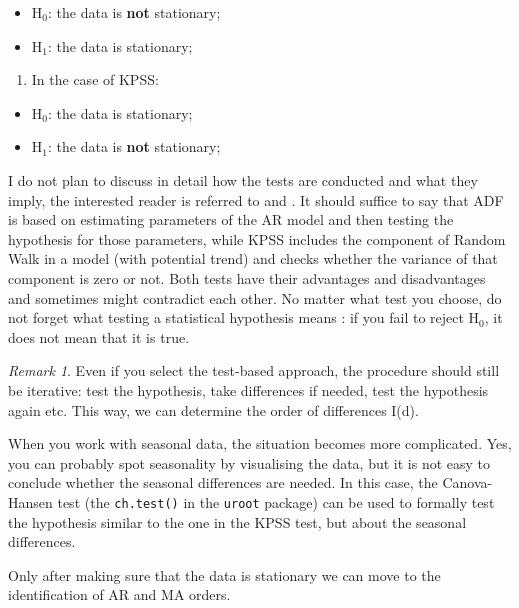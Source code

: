 \documentclass[]{book}
\providecommand{\tightlist}{%
  \setlength{\itemsep}{0pt}\setlength{\parskip}{0pt}}
\theoremstyle{definition}
\theoremstyle{definition}
\theoremstyle{definition}
\theoremstyle{definition}
\theoremstyle{remark}
\newtheorem*{remark}{Remark}
\begin{document}
\begin{itemize}
\tightlist
\item
  H\(_0\): the data is \textbf{not} stationary;
\item
  H\(_1\): the data is stationary;
\end{itemize}

\begin{enumerate}
\def\labelenumi{\arabic{enumi}.}
\setcounter{enumi}{1}
\tightlist
\item
  In the case of KPSS:
\end{enumerate}

\begin{itemize}
\tightlist
\item
  H\(_0\): the data is stationary;
\item
  H\(_1\): the data is \textbf{not} stationary;
\end{itemize}

I do not plan to discuss in detail how the tests are conducted and what they imply, the interested reader is referred to \citet{Dickey1979} and \citet{Kwiatkowski1992}. It should suffice to say that ADF is based on estimating parameters of the AR model and then testing the hypothesis for those parameters, while KPSS includes the component of Random Walk in a model (with potential trend) and checks whether the variance of that component is zero or not. Both tests have their advantages and disadvantages and sometimes might contradict each other. No matter what test you choose, do not forget what testing a statistical hypothesis means \citep[see Section 5.3 of][]{SvetunkovSBA}: if you fail to reject H\(_0\), it does not mean that it is true.

\begin{remark}
Even if you select the test-based approach, the procedure should still be iterative: test the hypothesis, take differences if needed, test the hypothesis again etc. This way, we can determine the order of differences I(d).
\end{remark}

When you work with seasonal data, the situation becomes more complicated. Yes, you can probably spot seasonality by visualising the data, but it is not easy to conclude whether the seasonal differences are needed. In this case, the Canova-Hansen test (the \texttt{ch.test()} in the \texttt{uroot} package) can be used to formally test the hypothesis similar to the one in the KPSS test, but about the seasonal differences.

Only after making sure that the data is stationary we can move to the identification of AR and MA orders.
\end{document}

